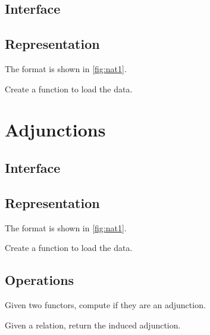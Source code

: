 \subsection*{Interface}

\subsection*{Representation}
The format is shown in \cref{fig:nat1}.



\begin{exercise}
Create a function to load the data.

%
\end{exercise}


\section{Adjunctions}

\subsection*{Interface}

\subsection*{Representation}

The format is shown in \cref{fig:nat1}.



\begin{exercise}
Create a function to load the data.

%
\end{exercise}

\subsection{Operations}
\begin{exercise}
Given two functors, compute if they are an adjunction.

\end{exercise}

\begin{exercise}
Given a relation, return the induced adjunction.
\end{exercise}


